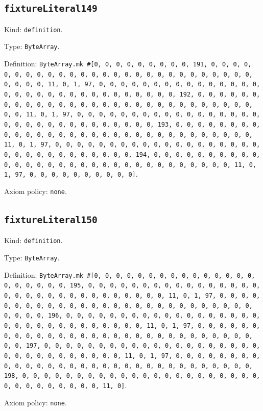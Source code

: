 \documentclass[11pt]{article}
\begin{document}
\subsection*{\texttt{fixtureLiteral149}}
\noindent Kind: \texttt{definition}.\par
\noindent Type: \texttt{ByteArray}.\par
\noindent Definition: \texttt{ByteArray.mk \#[0, 0, 0, 0, 0, 0, 0, 0, 0, 191, 0, 0, 0, 0, 0, 0, 0, 0, 0, 0, 0, 0, 0, 0, 0, 0, 0, 0, 0, 0, 0, 0, 0, 0, 0, 0, 0, 0, 0, 0, 0, 11, 0, 1, 97, 0, 0, 0, 0, 0, 0, 0, 0, 0, 0, 0, 0, 0, 0, 0, 0, 0, 0, 0, 0, 0, 0, 0, 0, 0, 0, 0, 0, 0, 0, 0, 192, 0, 0, 0, 0, 0, 0, 0, 0, 0, 0, 0, 0, 0, 0, 0, 0, 0, 0, 0, 0, 0, 0, 0, 0, 0, 0, 0, 0, 0, 0, 0, 11, 0, 1, 97, 0, 0, 0, 0, 0, 0, 0, 0, 0, 0, 0, 0, 0, 0, 0, 0, 0, 0, 0, 0, 0, 0, 0, 0, 0, 0, 0, 0, 0, 0, 0, 193, 0, 0, 0, 0, 0, 0, 0, 0, 0, 0, 0, 0, 0, 0, 0, 0, 0, 0, 0, 0, 0, 0, 0, 0, 0, 0, 0, 0, 0, 0, 0, 11, 0, 1, 97, 0, 0, 0, 0, 0, 0, 0, 0, 0, 0, 0, 0, 0, 0, 0, 0, 0, 0, 0, 0, 0, 0, 0, 0, 0, 0, 0, 0, 0, 0, 0, 194, 0, 0, 0, 0, 0, 0, 0, 0, 0, 0, 0, 0, 0, 0, 0, 0, 0, 0, 0, 0, 0, 0, 0, 0, 0, 0, 0, 0, 0, 0, 0, 11, 0, 1, 97, 0, 0, 0, 0, 0, 0, 0, 0, 0, 0]}.\par
\noindent Axiom policy: \texttt{none}.\par
\subsection*{\texttt{fixtureLiteral150}}
\noindent Kind: \texttt{definition}.\par
\noindent Type: \texttt{ByteArray}.\par
\noindent Definition: \texttt{ByteArray.mk \#[0, 0, 0, 0, 0, 0, 0, 0, 0, 0, 0, 0, 0, 0, 0, 0, 0, 0, 0, 0, 0, 195, 0, 0, 0, 0, 0, 0, 0, 0, 0, 0, 0, 0, 0, 0, 0, 0, 0, 0, 0, 0, 0, 0, 0, 0, 0, 0, 0, 0, 0, 0, 0, 11, 0, 1, 97, 0, 0, 0, 0, 0, 0, 0, 0, 0, 0, 0, 0, 0, 0, 0, 0, 0, 0, 0, 0, 0, 0, 0, 0, 0, 0, 0, 0, 0, 0, 0, 196, 0, 0, 0, 0, 0, 0, 0, 0, 0, 0, 0, 0, 0, 0, 0, 0, 0, 0, 0, 0, 0, 0, 0, 0, 0, 0, 0, 0, 0, 0, 0, 11, 0, 1, 97, 0, 0, 0, 0, 0, 0, 0, 0, 0, 0, 0, 0, 0, 0, 0, 0, 0, 0, 0, 0, 0, 0, 0, 0, 0, 0, 0, 0, 0, 0, 0, 197, 0, 0, 0, 0, 0, 0, 0, 0, 0, 0, 0, 0, 0, 0, 0, 0, 0, 0, 0, 0, 0, 0, 0, 0, 0, 0, 0, 0, 0, 0, 0, 11, 0, 1, 97, 0, 0, 0, 0, 0, 0, 0, 0, 0, 0, 0, 0, 0, 0, 0, 0, 0, 0, 0, 0, 0, 0, 0, 0, 0, 0, 0, 0, 0, 0, 0, 198, 0, 0, 0, 0, 0, 0, 0, 0, 0, 0, 0, 0, 0, 0, 0, 0, 0, 0, 0, 0, 0, 0, 0, 0, 0, 0, 0, 0, 0, 0, 0, 11, 0]}.\par
\noindent Axiom policy: \texttt{none}.\par
\end{document}
